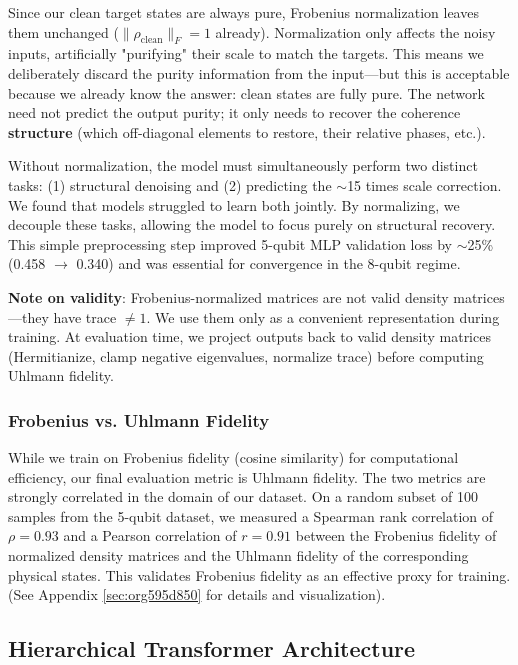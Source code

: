 \documentclass[11pt]{article}
\begin{document}
Since our clean target states are always pure, Frobenius normalization leaves them unchanged (\(\|\rho_{\text{clean}}\|_F = 1\) already). Normalization only affects the noisy inputs, artificially "purifying" their scale to match the targets. This means we deliberately discard the purity information from the input---but this is acceptable because we already know the answer: clean states are fully pure. The network need not predict the output purity; it only needs to recover the coherence \textbf{structure} (which off-diagonal elements to restore, their relative phases, etc.).

Without normalization, the model must simultaneously perform two distinct tasks: (1) structural denoising and (2) predicting the \(\sim\)15 times scale correction. We found that models struggled to learn both jointly. By normalizing, we decouple these tasks, allowing the model to focus purely on structural recovery. This simple preprocessing step improved 5-qubit MLP validation loss by \(\sim\)25\% (0.458 \(\to\) 0.340) and was essential for convergence in the 8-qubit regime.

\textbf{Note on validity}: Frobenius-normalized matrices are not valid density matrices---they have trace \(\neq 1\). We use them only as a convenient representation during training. At evaluation time, we project outputs back to valid density matrices (Hermitianize, clamp negative eigenvalues, normalize trace) before computing Uhlmann fidelity.
\subsubsection{Frobenius vs. Uhlmann Fidelity}
\label{sec:orgd66372a}

While we train on Frobenius fidelity (cosine similarity) for computational efficiency, our final evaluation metric is Uhlmann fidelity. The two metrics are strongly correlated in the domain of our dataset. On a random subset of 100 samples from the 5-qubit dataset, we measured a Spearman rank correlation of \(\rho = 0.93\) and a Pearson correlation of \(r = 0.91\) between the Frobenius fidelity of normalized density matrices and the Uhlmann fidelity of the corresponding physical states. This validates Frobenius fidelity as an effective proxy for training. (See Appendix \ref{sec:org595d850} for details and visualization).
\subsection{Hierarchical Transformer Architecture}
\label{sec:org645f004}
\end{document}
